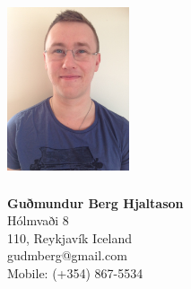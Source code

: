 \documentclass[margin]{res}
\begin{document}
\begin{figure}
\begin{minipage}[b]{0.45\linewidth}
\section {\includegraphics[height=4.8cm]{gberg_profile}}
\end{minipage}
\hspace{0.5cm}
\begin{minipage}[b]{0.45\linewidth}
{\large\bf Guðmundur Berg Hjaltason}\\
 Hólmvaði 8\\
 110, Reykjavík Iceland\\
 gudmberg@gmail.com\\
 Mobile: (+354) 867-5534\\
\end{minipage}
\end{figure}
\end{document}
